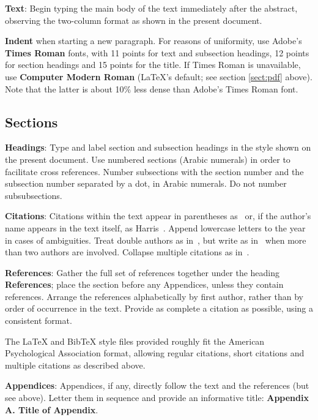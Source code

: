 \documentclass[11pt]{article}
\begin{document}
{\bf Text}: Begin typing the main body of the text immediately after
the abstract, observing the two-column format as shown in 
the present document.

{\bf Indent} when starting a new paragraph. For reasons of uniformity,
use Adobe's {\bf Times Roman} fonts, with 11 points for text and 
subsection headings, 12 points for section headings and 15 points for
the title. If Times Roman is unavailable, use {\bf Computer Modern
  Roman} (\LaTeX{}'s default; see section \ref{sect:pdf} above).
Note that the latter is about 10\% less dense than Adobe's Times Roman
font.

\subsection{Sections}

{\bf Headings}: Type and label section and subsection headings in the
style shown on the present document.  Use numbered sections (Arabic
numerals) in order to facilitate cross references. Number subsections
with the section number and the subsection number separated by a dot,
in Arabic numerals. Do not number subsubsections.

{\bf Citations}: Citations within the text appear in parentheses
as~\cite{harris1955-phoneme} or, if the author's name appears in the
text itself, as Harris~.  Append
lowercase letters to the year in cases of ambiguities.  Treat double
authors as in~\cite{hafer1974-word}, but write as
in~\cite{hana2006-tagging} when more than two authors are involved.
Collapse multiple citations as
in~\cite{harris1967-morpheme,dejean1998-morphemes}.

\textbf{References}: Gather the full set of references together under
the heading {\bf References}; place the section before any Appendices,
unless they contain references. Arrange the references alphabetically
by first author, rather than by order of occurrence in the text.
Provide as complete a citation as possible, using a consistent format.

The \LaTeX{} and Bib\TeX{} style files provided roughly fit the
American Psychological Association format, allowing regular citations, 
short citations and multiple citations as described above.

{\bf Appendices}: Appendices, if any, directly follow the text and the
references (but see above).  Letter them in sequence and provide an
informative title: {\bf Appendix A. Title of Appendix}.
\end{document}

